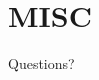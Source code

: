 \documentclass{beamer}
\newcommand{\weib}{\CJKfamily{weib}}
\begin{document}

\section{MISC}
\begin{frame}
	\begin{center}
    \LARGE{Questions?}
	\end{center}
\end{frame}
\end{document}
